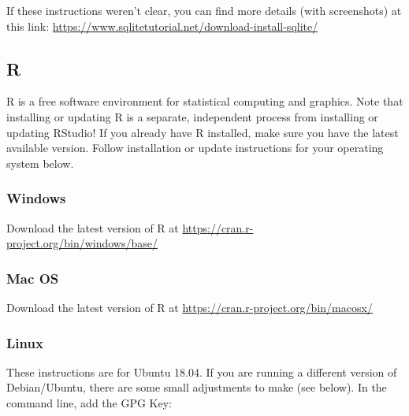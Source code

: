 \documentclass[
]{book}
\newenvironment{Shaded}{\begin{snugshade}}{\end{snugshade}}
\newcommand{\AttributeTok}[1]{\textcolor[rgb]{0.13,0.29,0.53}{#1}}
\newcommand{\ExtensionTok}[1]{#1}
\newcommand{\NormalTok}[1]{#1}
\begin{document}
If these instructions weren't clear, you can find more details (with screenshots)
at this link: \url{https://www.sqlitetutorial.net/download-install-sqlite/}

\hypertarget{r}{%
\subsection{R}\label{r}}

R is a free software environment for statistical computing and graphics. Note
that installing or updating R is a separate, independent process from installing
or updating RStudio! If you already have R installed, make sure you have the
latest available version. Follow installation or update instructions for your
operating system below.

\hypertarget{windows-1}{%
\subsubsection{Windows}\label{windows-1}}

Download the latest version of R at \url{https://cran.r-project.org/bin/windows/base/}

\hypertarget{mac-os-1}{%
\subsubsection{Mac OS}\label{mac-os-1}}

Download the latest version of R at \url{https://cran.r-project.org/bin/macosx/}

\hypertarget{linux-1}{%
\subsubsection{Linux}\label{linux-1}}

These instructions are for Ubuntu 18.04. If you are running a different version
of Debian/Ubuntu, there are some small adjustments to make (see below). In the command
line, add the GPG Key:

\begin{Shaded}
\end{Shaded}
\end{document}
